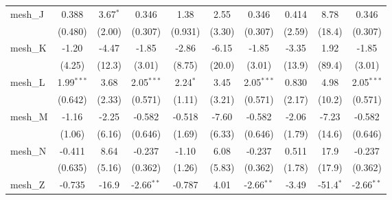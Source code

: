 \begin{tabular}{lccccccccc}
   mesh\_J                                                     & 0.388          & 3.67$^{*}$    & 0.346          & 1.38           & 2.55         & 0.346          & 0.414         & 8.78          & 0.346\\   
                                                               & (0.480)        & (2.00)        & (0.307)        & (0.931)        & (3.30)       & (0.307)        & (2.59)        & (18.4)        & (0.307)\\   
   mesh\_K                                                     & -1.20          & -4.47         & -1.85          & -2.86          & -6.15        & -1.85          & -3.35         & 1.92          & -1.85\\   
                                                               & (4.25)         & (12.3)        & (3.01)         & (8.75)         & (20.0)       & (3.01)         & (13.9)        & (89.4)        & (3.01)\\   
   mesh\_L                                                     & 1.99$^{***}$   & 3.68          & 2.05$^{***}$   & 2.24$^{*}$     & 3.45         & 2.05$^{***}$   & 0.830         & 4.98          & 2.05$^{***}$\\   
                                                               & (0.642)        & (2.33)        & (0.571)        & (1.11)         & (3.21)       & (0.571)        & (2.17)        & (10.2)        & (0.571)\\   
   mesh\_M                                                     & -1.16          & -2.25         & -0.582         & -0.518         & -7.60        & -0.582         & -2.06         & -7.23         & -0.582\\   
                                                               & (1.06)         & (6.16)        & (0.646)        & (1.69)         & (6.33)       & (0.646)        & (1.79)        & (14.6)        & (0.646)\\   
   mesh\_N                                                     & -0.411         & 8.64          & -0.237         & -1.10          & 6.08         & -0.237         & 0.511         & 17.9          & -0.237\\   
                                                               & (0.635)        & (5.16)        & (0.362)        & (1.26)         & (5.83)       & (0.362)        & (1.78)        & (17.9)        & (0.362)\\   
   mesh\_Z                                                     & -0.735         & -16.9         & -2.66$^{**}$   & -0.787         & 4.01         & -2.66$^{**}$   & -3.49         & -51.4$^{*}$   & -2.66$^{**}$\\   

\end{tabular}
